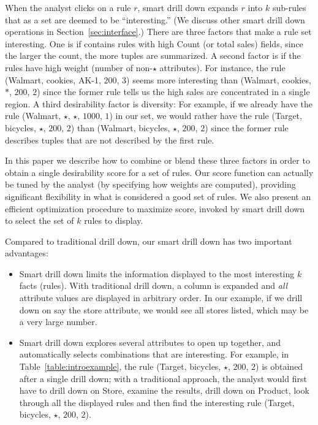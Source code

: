 \begin{example}
When the analyst clicks on a rule $r$, smart drill down
expands $r$ into $k$ sub-rules that as a set are deemed to be ``interesting.''
(We discuss other smart drill down operations in Section~\ref{sec:interface}.)
There are three factors that make a rule set interesting.
One is if contains rules with high Count (or total sales) fields,
since the larger the count, the more tuples are summarized.
A second factor is if the rules have high weight (number of non-$\star$ attributes).
For instance, the rule (Walmart, cookies, AK-1, $200$, $3$)
seems more interesting than (Walmart, cookies, $*$, $200$, $2$)
since the former rule tells us the high sales are concentrated in a single region.
A third desirability factor is diversity:
For example, if we already have the rule (Walmart, $\star$, $\star$, $1000$, $1$)
in our set, we would rather have the rule (Target, bicycles, $\star$, $200$, $2$)
than (Walmart, bicycles, $\star$, $200$, $2$) since the former rule
describes tuples that are not described by the first rule.

In this paper we describe how to combine or blend these three factors
in order to obtain a single desirability score for a set of rules.
Our score function can actually be tuned by the analyst
(by specifying how weights are computed),
providing significant flexibility in what is considered a good set of rules.
We also present an efficient optimization procedure to maximize score, invoked
by smart drill down to select the set of $k$ rules to display.

\end{example}

Compared to traditional drill down, our smart drill down has two important advantages:
\begin{itemize}
\item
Smart drill down limits the information displayed
to the most interesting $k$ facts (rules).
With traditional drill down, a column is expanded and {\em all}
attribute values are displayed in arbitrary order.
In our example, if we drill down on say the store attribute,
we would see all stores listed, which may be a very large number.
\item
Smart drill down explores several attributes to open up together,
and automatically selects combinations that are interesting.
For example, in Table~\ref{table:introexample},
the rule (Target, bicycles, $\star$, $200$, $2$)
is obtained after a single drill down;
with a traditional approach, the analyst would first have to drill down on
Store, examine the results, drill down on Product,
look through all the displayed rules and then find the interesting rule
(Target, bicycles, $\star$, $200$, $2$).
\end{itemize}

